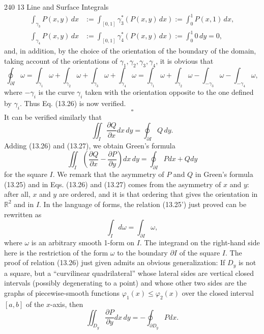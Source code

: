 240 \hfill 13 Line and Surface Integrals
\begin{align*} \int_{\gamma_3} P(x, y) \, dx &:= \int_{[0,1]} \gamma_3^*(P(x, y) \, dx) := \int_0^1 P(x, 1) \, dx, \\ \int_{\gamma_4} P(x, y) \, dx &:= \int_{[0,1]} \gamma_4^*(P(x, y) \, dx) := \int_0^1 0 \, dy = 0, \end{align*}
and, in addition, by the choice of the orientation of the boundary of the domain,
taking account of the orientations of $\gamma_1, \gamma_2, \gamma_3, \gamma_4$, it is obvious that
\[ \oint_{\partial I} \omega = \int_{\gamma_1} \omega + \int_{\gamma_2} \omega + \int_{\gamma_3} \omega + \int_{\gamma_4} \omega = \int_{\gamma_1} \omega + \int_{\gamma_2} \omega - \int_{-\gamma_3} \omega - \int_{-\gamma_4} \omega, \]
where $-\gamma_i$ is the curve $\gamma_i$ taken with the orientation opposite to the one defined
by $\gamma_i$.
Thus Eq. (13.26) is now verified.
\[ \square \]
It can be verified similarly that
\[ \iint_{I} \frac{\partial Q}{\partial x} dx \, dy = \oint_{\partial I} Q \, dy. \tag{13.27} \]
Adding (13.26) and (13.27), we obtain Green's formula
\[ \iint_{I} \left( \frac{\partial Q}{\partial x} - \frac{\partial P}{\partial y} \right) dx \, dy = \oint_{\partial I} P dx + Q dy \tag{13.25'} \]
for the square $I$.
We remark that the asymmetry of $P$ and $Q$ in Green's formula (13.25) and in
Eqs. (13.26) and (13.27) comes from the asymmetry of $x$ and $y$: after all, $x$ and $y$
are ordered, and it is that ordering that gives the orientation in $\mathbb{R}^2$ and in $I$.
In the language of forms, the relation (13.25') just proved can be rewritten as
\[ \int_{I} d\omega = \int_{\partial I} \omega, \tag{13.25''} \]
where $\omega$ is an arbitrary smooth 1-form on $I$. The integrand on the right-hand side here
is the restriction of the form $\omega$ to the boundary $\partial I$ of the square $I$.
The proof of relation (13.26) just given admits an obvious generalization: If $D_y$
is not a square, but a ``curvilinear quadrilateral'' whose lateral sides are vertical closed
intervals (possibly degenerating to a point) and whose other two sides are the graphs
of piecewise-smooth functions $\varphi_1(x) \le \varphi_2(x)$ over the closed interval $[a, b]$ of the
$x$-axis, then
\[ \iint_{D_y} \frac{\partial P}{\partial y} dx \, dy = - \oint_{\partial D_y} P dx. \tag{13.26'} \]